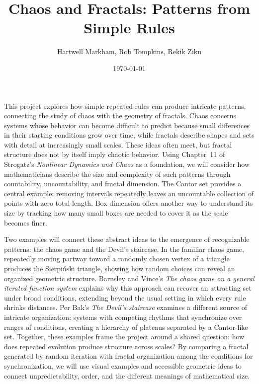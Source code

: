 \documentclass[12pt]{amsart}
\title{Chaos and Fractals: Patterns from Simple Rules}
\author{Hartwell Markham, Rob Tompkins, Rekik Ziku}
\date{\today}
\theoremstyle{conjecture}
\theoremstyle{definition}
\theoremstyle{question}
\theoremstyle{theorem}
\begin{document}
    \maketitle
    This project explores how simple repeated rules can produce intricate patterns, connecting the study of chaos with the
    geometry of fractals.
    Chaos concerns systems whose behavior can become difficult to predict because small differences in their starting
    conditions grow over time, while fractals describe shapes and sets with detail at increasingly small scales.
    These ideas often meet, but fractal structure does not by itself imply chaotic behavior.
    Using Chapter~11 of Strogatz's \emph{Nonlinear Dynamics and Chaos} as a foundation, we will consider how mathematicians
    describe the size and complexity of such patterns through countability, uncountability, and fractal dimension.
    The Cantor set provides a central example: removing intervals repeatedly leaves an uncountable collection of points with
    zero total length.
    Box dimension offers another way to understand its size by tracking how many small boxes are needed to cover it as the
    scale becomes finer.

    Two examples will connect these abstract ideas to the emergence of recognizable patterns: the chaos game and the Devil's
    staircase.
    In the familiar chaos game, repeatedly moving partway toward a randomly chosen vertex of a triangle produces the
    Sierpi\'nski triangle, showing how random choices can reveal an organized geometric structure.
    Barnsley and Vince's \emph{The chaos game on a general iterated function system} explains why this approach can recover
    an attracting set under broad conditions, extending beyond the usual setting in which every rule shrinks distances.
    Per Bak's \emph{The Devil's staircase} examines a different source of intricate organization: systems with competing
    rhythms that synchronize over ranges of conditions, creating a hierarchy of plateaus separated by a Cantor-like set.
    Together, these examples frame the project around a shared question: how does repeated evolution produce structure
    across scales?
    By comparing a fractal generated by random iteration with fractal organization among the conditions for synchronization,
    we will use visual examples and accessible geometric ideas to connect unpredictability, order, and the different
    meanings of mathematical size.
\end{document}
